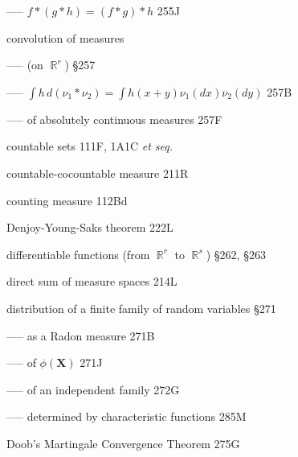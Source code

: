 ----- $f*(g*h)=(f*g)*h$ 255J


convolution of measures

----- (on $\BbbR^r$) \S257



----- $\int h\,d(\nu_1*\nu_2)=\int h(x+y)\nu_1(dx)\nu_2(dy)$
257B


----- of absolutely continuous measures 257F






countable sets 111F, 1A1C {\it et seq.}

countable-cocountable measure 211R








counting measure 112Bd










\indexmedskip







Denjoy-Young-Saks theorem 222L




differentiable functions (from $\BbbR^r$ to $\BbbR^s$) \S262, \S263


direct sum of measure spaces 214L










distribution of a finite family of random variables \S271

----- as a Radon measure 271B

----- of $\phi(\pmb{X})$ 271J

----- of an independent family 272G

----- determined by characteristic functions 285M
















Doob's Martingale Convergence Theorem 275G



















